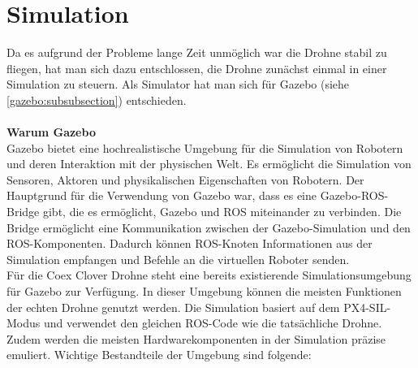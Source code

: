 \section{Simulation} \label{simulation:section}
Da es aufgrund der Probleme lange Zeit unmöglich war die Drohne stabil zu fliegen, hat man sich dazu entschlossen, die Drohne zunächst einmal in einer Simulation zu steuern. Als Simulator hat man sich für Gazebo (siehe \ref{gazebo:subsubsection}) entschieden. \\
\\
\textbf{Warum Gazebo}\\
Gazebo bietet eine hochrealistische Umgebung für die Simulation von Robotern und deren Interaktion mit der physischen Welt. Es ermöglicht die Simulation von Sensoren, Aktoren und physikalischen Eigenschaften von Robotern. Der Hauptgrund für die Verwendung von Gazebo war, dass es eine Gazebo-ROS-Bridge gibt, die es ermöglicht, Gazebo und ROS miteinander zu verbinden. Die Bridge ermöglicht eine Kommunikation zwischen der Gazebo-Simulation und den ROS-Komponenten. Dadurch können ROS-Knoten Informationen aus der Simulation empfangen und Befehle an die virtuellen Roboter senden. \\

Für die Coex Clover Drohne steht eine bereits existierende Simulationsumgebung für Gazebo zur Verfügung. In dieser Umgebung können die meisten Funktionen der echten Drohne genutzt werden. Die Simulation basiert auf dem PX4-SIL-Modus und verwendet den gleichen ROS-Code wie die tatsächliche Drohne. Zudem werden die meisten Hardwarekomponenten in der Simulation präzise emuliert. Wichtige Bestandteile der Umgebung sind folgende:

